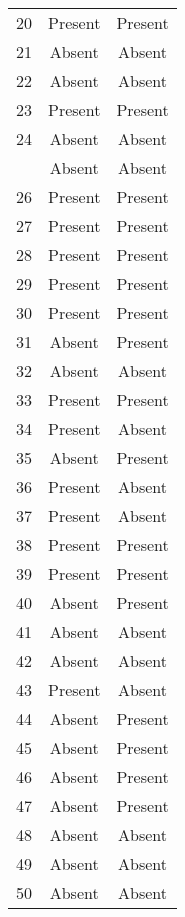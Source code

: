 \begin{longtable}[H]{@{}ccc@{}}
20      & Present           & Present                 \\
21      & Absent            & Absent                  \\
22      & Absent            & Absent                  \\
23      & Present           & Present                 \\
24      & Absent            & Absent                  \\\columnbreak
25      & Absent            & Absent                  \\
26      & Present           & Present                 \\
27      & Present           & Present                 \\
28      & Present           & Present                 \\
29      & Present           & Present                 \\
30      & Present           & Present                 \\
31      & Absent            & Present                 \\
32      & Absent            & Absent                  \\
33      & Present           & Present                 \\
34      & Present           & Absent                  \\
35      & Absent            & Present                 \\
36      & Present           & Absent                  \\
37      & Present           & Absent                  \\
38      & Present           & Present                 \\
39      & Present           & Present                 \\
40      & Absent            & Present                 \\
41      & Absent            & Absent                  \\
42      & Absent            & Absent                  \\
43      & Present           & Absent                  \\
44      & Absent            & Present                 \\
45      & Absent            & Present                 \\
46      & Absent            & Present                 \\
47      & Absent            & Present                 \\
48      & Absent            & Absent                  \\
49      & Absent            & Absent                  \\
50      & Absent            & Absent                  \\* \bottomrule
\end{longtable}

